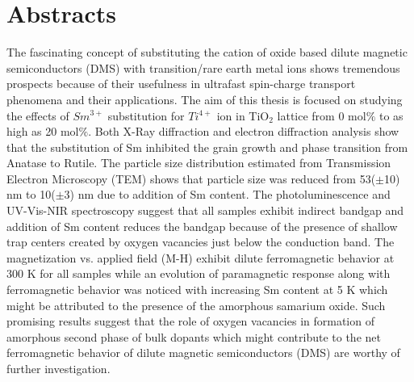 \documentclass[main.tex]{subfiles}
\begin{document}
\chapter*{\vspace{-2cm}Abstracts}

The fascinating concept of substituting the cation of oxide based dilute magnetic semiconductors (DMS) with transition/rare earth metal ions shows tremendous prospects because of their usefulness in ultrafast spin-charge transport phenomena and their applications. The aim of this thesis is focused on studying the effects of $Sm^{3+}$ substitution for $Ti^{4+}$ ion in TiO$_{2}$ lattice from 0 mol$\%$ to as high as 20 mol$\%$. Both X-Ray diffraction and electron diffraction analysis show that the substitution of Sm inhibited the grain growth and phase transition from Anatase to Rutile. The particle size distribution estimated from Transmission Electron Microscopy (TEM) shows that particle size was reduced from 53($\pm$10) nm to 10($\pm$3) nm due to addition of Sm content. The photoluminescence  and UV-Vis-NIR spectroscopy suggest that all samples exhibit indirect bandgap and addition of Sm content reduces the bandgap because of the presence of shallow trap centers created by oxygen vacancies just below the conduction band. The magnetization vs. applied field (M-H) exhibit dilute ferromagnetic behavior at 300 K for all samples while an evolution of paramagnetic response along with ferromagnetic behavior was noticed with increasing Sm content at 5 K which might be attributed to the presence of the amorphous samarium oxide. Such promising results suggest that the role of oxygen vacancies in formation of amorphous second phase of bulk dopants which might contribute to the net ferromagnetic behavior of dilute magnetic semiconductors (DMS) are worthy of further investigation. 



\thispagestyle{fancy}
\newpage
\end{document}
